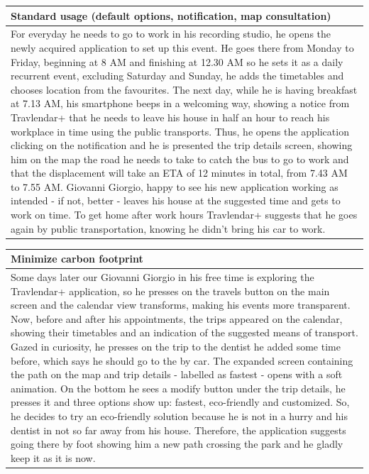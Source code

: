 %
\begin{center}
\def\arraystretch{1.5}
  \begin{tabular}{ | p{} | }
    \hline
    Standard usage (default options, notification, map consultation) \\ \hline
    For everyday he needs to go to work in his recording studio, he opens the newly acquired application to set up this event. He goes there from Monday to Friday, beginning at 8 AM and finishing at 12.30 AM so he sets it as a daily recurrent event, excluding Saturday and Sunday, he adds the timetables and chooses location from the favourites. The next day, while he is having breakfast at 7.13 AM, his smartphone beeps in a welcoming way, showing a notice from Travlendar+ that he needs to leave his house in half an hour to reach his workplace in time using the public transports. Thus, he opens the application clicking on the notification and he is presented the trip details screen, showing him on the map the road he needs to take to catch the bus to go to work and that the displacement will take an ETA of 12 minutes in total, from 7.43 AM to 7.55 AM. Giovanni Giorgio, happy to see his new application working as intended - if not, better - leaves his house at the suggested time and gets to work on time. To get home after work hours Travlendar+ suggests that he goes again by public transportation, knowing he didn’t bring his car to work. \\ \hline
  \end{tabular}
\end{center}
%
\begin{center}
\def\arraystretch{1.5}
  \begin{tabular}{ | p{} | }
    \hline
    Minimize carbon footprint \\ \hline
    Some days later our Giovanni Giorgio in his free time is exploring the Travlendar+ application, so he presses on the travels button on the main screen and the calendar view transforms, making his events more transparent. Now, before and after his appointments, the trips appeared on the calendar, showing their timetables and an indication of the suggested means of transport. Gazed in curiosity, he presses on the trip to the dentist he added some time before, which says he should go to the by car. The expanded screen containing the path on the map and trip details - labelled as fastest - opens with a soft animation. On the bottom he sees a modify button under the trip details, he presses it and three options show up: fastest, eco-friendly and customized. So, he decides to try an eco-friendly solution because he is not in a hurry and his dentist in not so far away from his house. Therefore, the application suggests going there by foot showing him a new path crossing the park and he gladly keep it as it is now. \\ \hline
  \end{tabular}
\end{center}
